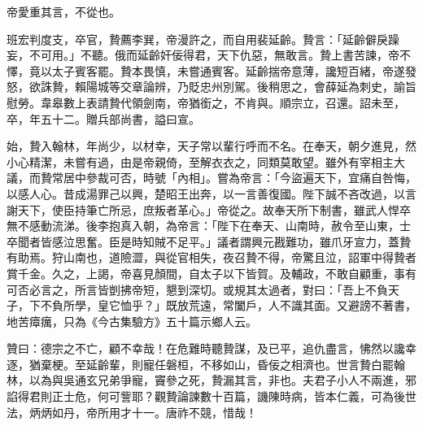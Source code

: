 \begin{pinyinscope}
 帝愛重其言，不從也。



 班宏判度支，卒官，贄薦李巽，帝漫許之，而自用裴延齡。贄言：「延齡僻戾躁妄，不可用。」不聽。俄而延齡奸佞得君，天下仇惡，無敢言。贄上書苦諫，帝不懌，竟以太子賓客罷。贄本畏慎，未嘗通賓客。延齡揣帝意薄，讒短百緒，帝遂發怒，欲誅贄，賴陽城等交章論辨，乃貶忠州別駕。後稍思之，會薛延為刺史，諭旨慰勞。韋皋數上表請贄代領劍南，帝猶銜之，不肯與。順宗立，召還。詔未至，卒，年五十二。贈兵部尚書，謚曰宣。



 始，贄入翰林，年尚少，以材幸，天子常以輩行呼而不名。在奉天，朝夕進見，然小心精潔，未嘗有過，由是帝親倚，至解衣衣之，同類莫敢望。雖外有宰相主大議，而贄常居中參裁可否，時號「內相」。嘗為帝言：「今盜遍天下，宜痛自咎悔，以感人心。昔成湯罪己以興，楚昭王出奔，以一言善復國。陛下誠不吝改過，以言謝天下，使臣持筆亡所忌，庶叛者革心。」帝從之。故奉天所下制書，雖武人悍卒無不感動流涕。後李抱真入朝，為帝言：「陛下在奉天、山南時，赦令至山東，士卒聞者皆感泣思奮。臣是時知賊不足平。」議者謂興元戡難功，雖爪牙宣力，蓋贄有助焉。狩山南也，道險澀，與從官相失，夜召贄不得，帝驚且泣，詔軍中得贄者賞千金。久之，上謁，帝喜見顏間，自太子以下皆賀。及輔政，不敢自顧重，事有可否必言之，所言皆剴拂帝短，懇到深切。或規其太過者，對曰：「吾上不負天子，下不負所學，皇它恤乎？」既放荒遠，常闔戶，人不識其面。又避謗不著書，地苦瘴癘，只為《今古集驗方》五十篇示鄉人云。



 贊曰：德宗之不亡，顧不幸哉！在危難時聽贄謀，及已平，追仇盡言，怫然以讒幸逐，猶棄梗。至延齡輩，則寵任磐桓，不移如山，昏佞之相濟也。世言贄白罷翰林，以為與吳通玄兄弟爭寵，竇參之死，贄漏其言，非也。夫君子小人不兩進，邪諂得君則正士危，何可訾耶？觀贄論諫數十百篇，譏陳時病，皆本仁義，可為後世法，炳炳如丹，帝所用才十一。唐祚不競，惜哉！



\end{pinyinscope}
